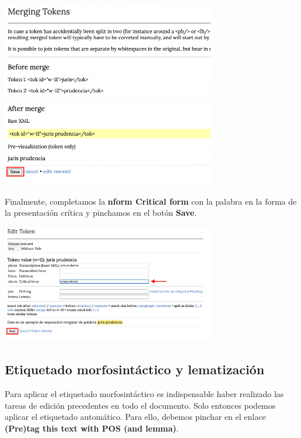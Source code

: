 \documentclass[
]{book}
\begin{document}
\includegraphics[width=0.7\textwidth,height=\textheight]{img/separacion2.png}

Finalmente, completamos la \textbf{nform Critical form} con la palabra en la forma de la presentación crítica y pinchamos en el botón \textbf{Save}.

\includegraphics[width=0.7\textwidth,height=\textheight]{img/separacion3.png}

\hypertarget{etiquetado-morfosintuxe1ctico-y-lematizaciuxf3n}{%
\subsection*{Etiquetado morfosintáctico y lematización}\label{etiquetado-morfosintuxe1ctico-y-lematizaciuxf3n}}

Para aplicar el etiquetado morfosintáctico es indispensable haber realizado las tareas de edición precedentes en todo el documento. Solo entonces podemos aplicar el etiquetado automático. Para ello, debemos pinchar en el enlace \textbf{(Pre)tag this text with POS (and lemma)}.
\end{document}
